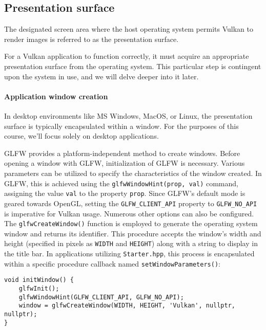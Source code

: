 \subsection{Presentation surface}
The designated screen area where the host operating system permits Vulkan to render images is referred to as the presentation surface.

For a Vulkan application to function correctly, it must acquire an appropriate presentation surface from the operating system. 
This particular step is contingent upon the system in use, and we will delve deeper into it later.

\paragraph*{Application window creation}
In desktop environments like MS Windows, MacOS, or Linux, the presentation surface is typically encapsulated within a window. 
For the purposes of this course, we'll focus solely on desktop applications.

GLFW provides a platform-independent method to create windows. Before opening a window with GLFW, initialization of GLFW is necessary. 
Various parameters can be utilized to specify the characteristics of the window created. 
In GLFW, this is achieved using the \texttt{glfwWindowHint(prop, val)} command, assigning the value \texttt{val} to the property \texttt{prop}. 
Since GLFW's default mode is geared towards OpenGL, setting the \texttt{GLFW\_CLIENT\_API} property to \texttt{GLFW\_NO\_API} is imperative for Vulkan usage. 
Numerous other options can also be configured.
The \texttt{glfwCreateWindow()} function is employed to generate the operating system window and returns its identifier. 
This procedure accepts the window's width and height (specified in pixels as \texttt{WIDTH} and \texttt{HEIGHT}) along with a string to display in the title bar.
In applications utilizing \texttt{Starter.hpp}, this process is encapsulated within a specific procedure callback named \texttt{setWindowParameters()}:
\begin{verbatim}
void initWindow() {
    glfwInit();
    glfwWindowHint(GLFW_CLIENT_API, GLFW_NO_API); 
    window = glfwCreateWindow(WIDTH, HEIGHT, 'Vulkan', nullptr, nullptr);
}
\end{verbatim}